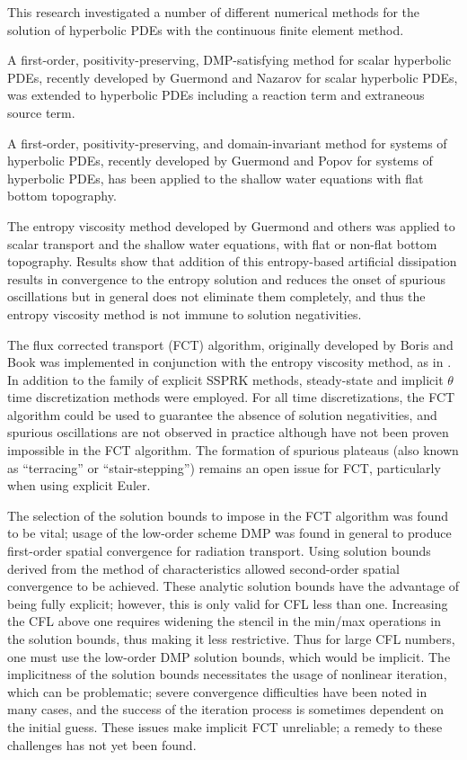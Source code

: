 This research investigated a number of different numerical methods for
the solution of hyperbolic PDEs with the continuous finite element
method.

A first-order, positivity-preserving, DMP-satisfying method
for scalar hyperbolic PDEs, recently developed by Guermond and Nazarov
\cite{guermond_firstorder} for scalar hyperbolic PDEs, was extended
to hyperbolic PDEs including a reaction term and extraneous source term.

A first-order, positivity-preserving, and domain-invariant method for systems
of hyperbolic PDEs, recently developed by Guermond and Popov
\cite{guermond_invariantdomain} for systems of hyperbolic PDEs,
has been applied to the shallow water equations with flat bottom topography.

The entropy viscosity method developed by Guermond and others \cite{guermond_ev}
was applied to scalar transport and the shallow water equations, with flat
or non-flat bottom topography. Results show that addition of this entropy-based
artificial dissipation results in convergence to the entropy solution
and reduces the onset of spurious oscillations but in general does not eliminate
them completely, and thus the entropy viscosity method is not immune to
solution negativities.

The flux corrected transport (FCT) algorithm, originally developed by Boris
and Book \cite{borisbook} was implemented in conjunction with the entropy
viscosity method, as in \cite{guermond_secondorder}. In addition to the
family of explicit SSPRK methods, steady-state and implicit $\theta$
time discretization methods were employed. For all time discretizations,
the FCT algorithm could be used to guarantee the absence of solution
negativities, and spurious oscillations are not observed in practice
although have not been proven impossible in the FCT algorithm. The formation
of spurious plateaus (also known as ``terracing'' or ``stair-stepping'')
remains an open issue for FCT, particularly when using explicit Euler.

The selection of the solution bounds to impose in the FCT algorithm
was found to be vital; usage of the low-order scheme DMP was found in
general to produce first-order spatial convergence for radiation transport.
Using solution bounds derived from the method of characteristics allowed
second-order spatial convergence to be achieved. These analytic solution
bounds have the advantage of being fully explicit; however, this is only
valid for CFL less than one. Increasing the CFL above one requires widening
the stencil in the min/max operations in the solution bounds, thus making
it less restrictive. Thus for large CFL numbers, one must use the low-order
DMP solution bounds, which would be implicit. The implicitness of the
solution bounds necessitates the usage of nonlinear iteration, which can
be problematic; severe convergence difficulties have been noted in many
cases, and the success of the iteration process is sometimes dependent
on the initial guess. These issues make implicit FCT unreliable; a remedy
to these challenges has not yet been found.

